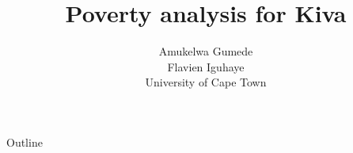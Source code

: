 \documentclass[10pt]{beamer}
\begin{document}
\title[Poverty analysis]{Poverty analysis for Kiva}

\author[A. Gumede, F. Iguhaye, University of Cape Town] %
{Amukelwa Gumede\\Flavien Iguhaye \\ University of Cape Town} %




\subject{}







\begin{frame}
  \titlepage
\end{frame}

\begin{frame}{Outline}
  \tableofcontents
\end{frame}
\end{document}
